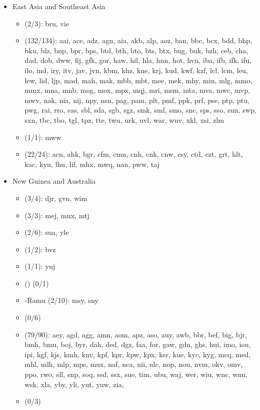 \begin{itemize}[label={},leftmargin=0cm,labelindent=5pt,itemindent=0pt]
    \newpage
  \item East Asia and Southeast Asia 
    \begin{itemize}[label={},leftmargin=!,labelindent=5pt,itemindent=-15pt]
  	\item {} (2/3): bru, vie
  	\item {} (132/134): aai, ace, adz, agn, aia, akb, alp, aoz, ban, bbc, bcx, bdd, bhp, bku, blz, bnp, bpr, bps, btd, bth, bto, bts, btx, bug, buk, bzh, ceb, cha, dad, dob, dww, fij, gfk, gor, haw, hil, hla, hnn, hot, hvn, iba, ifb, ifk, ifu, ilo, ind, iry, itv, jav, jvn, kbm, khz, kne, krj, kud, kwf, kzf, lcl, lcm, leu, lew, lid, ljp, mad, mah, mak, mbb, mbt, mee, mek, mhy, min, mlg, mmo, mmx, mna, mnb, mog, mox, mpx, mqj, mri, msm, mta, mva, mwc, mvp, mwv, nak, nia, nij, npy, nsn, pag, pam, plt, pmf, ppk, prf, pse, ptp, ptu, pwg, rai, rro, sas, sbl, sda, sgb, sgz, smk, sml, smo, snc, sps, sso, sun, swp, sxn, tbc, tbo, tgl, tpz, tte, twu, urk, uvl, war, wuv, xkl, xsi, zlm
  	\item {} (1/1): mww
  	\item {} (22/24): acn, ahk, bgr, cfm, cmn, cnh, cnk, cnw, csy, ctd, czt, grt, hlt, kac, kyu, lhu, lif, mhx, mwq, nan, pww, taj
    \end{itemize}

  \item New Guinea and Australia
    \begin{itemize}[label={},leftmargin=!,labelindent=5pt,itemindent=-15pt]
  	\item {} (3/4): djr, gvn, wim
  	\item {} (3/3): mej, mnx, mtj
  	\item {} (2/6): sua, yle
  	\item {} (1/2): bvz
  	\item {} (1/1): yuj
  	\item {} () (0/1)
  	\item {}-Ramu (2/10): msy, sny
  	\item {} (0/6)
  	\item {} (79/90): aey, agd, agg, amn, aom, apz, aso, auy, awb, bbr, bef, big, bjr, bmh, bmu, boj, byr, dah, ded, dgz, faa, for, gaw, gdn, ghs, hui, imo, iou, ipi, kgf, kjs, kmh, knv, kpf, kpr, kpw, kpx, ksr, kue, kyc, kyg, mcq, med, mhl, mlh, mlp, mps, mux, naf, nca, nii, nlc, nop, nou, nvm, okv, omv, ppo, rwo, sll, snp, soq, ssd, ssx, sue, tim, ubu, waj, wer, wiu, wnc, wnu, wsk, xla, yby, yli, yut, yuw, zia,
  	\item {} (0/3)
    \end{itemize}


\end{itemize}
